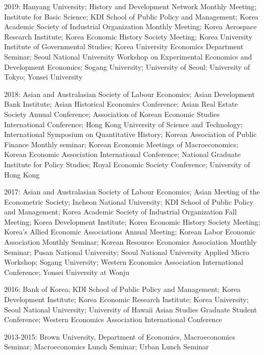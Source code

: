 \documentclass[a4paper,12pt]{article}
\renewenvironment{itemize}{
  \begin{list}{}{
    \setlength{\leftmargin}{1.5em}
  }
}{
  \end{list}
}
\begin{document}
\begin{itemize}
\item 2019: Hanyang University; History and Development Network Monthly Meeting; Institute for Basic Science; KDI School of Public Policy and Management; Korea Academic Society of Industrial Organization Monthly Meeting; Korea Aerospace Research Institute; Korea Economic History Society Meeting; Korea University Institute of Governmental Studies; Korea University Economics Department Seminar; Seoul National University Workshop on Experimental Economics and Development Economics; Sogang University; University of Seoul; University of Tokyo; Yonsei University
\vspace{2mm}
\item 2018: Asian and Australasian Society of Labour Economics; Asian Development Bank Institute; Asian Historical Economics Conference; Asian Real Estate Society Annual Conference; Association of Korean Economic Studies International Conference; Hong Kong University of Science and Technology; International Symposium on Quantitative History; Korean Association of Public Finance Monthly seminar; Korean Economic Meetings of Macroeconomics; Korean Economic Association International Conference; National Graduate Institute for Policy Studies; Royal Economic Society Conference;  University of Hong Kong
\vspace{2mm}
\item 2017: Asian and Australasian Society of Labour Economics; Asian Meeting of the Econometric Society; Incheon National University; KDI School of Public Policy and Management; Korea Academic Society of Industrial Organization Fall Meeting; Korea Development Institute; Korea Economic History Society Meeting; Korea's Allied Economic Associations Annual Meeting; Korean Labor Economic Association Monthly Seminar; Korean Resource Economics Association Monthly Seminar; Pusan National University;  Seoul National University Applied Micro Workshop; Sogang University; Western Economics Association International Conference; Yonsei University at Wonju
\vspace{2mm}
\item 2016: Bank of Korea; KDI School of Public Policy and Management; Korea Development Institute; Korea Economic Research Institute; Korea University; Seoul National University; University of Hawaii Asian Studies Graduate Student Conference; Western Economics Association International Conference
\vspace{2mm}
\item 2013-2015: Brown University, Department of Economics, Macroeconomics Seminar; Macroeconomics Lunch Seminar; Urban Lunch Seminar
\end{itemize}
\end{document}
